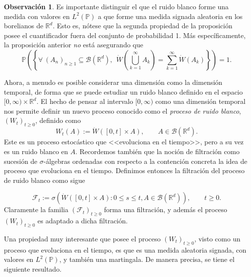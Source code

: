 \documentclass[letterpaper,twoside,12pt]{book}
\newcommand{\R}{\mathbb{R}}
\newcommand{\F}{\mathcal{F}}
\newcommand{\B}{\mathcal{B}}
\renewcommand{\P}{\mathbb{P}}
\newcommand{\W}{\dot{W}}
\newcommand{\1}{\mathds{1}}
\theoremstyle{definition}
\theoremstyle{definition}
\theoremstyle{remark}
\theoremstyle{definition}
\theoremstyle{definition}
\theoremstyle{definition}
\newtheorem{obs}{Observación}
\theoremstyle{definition}
\theoremstyle{definition}
\begin{document}
 \begin{obs}
   Es importante distinguir el que el ruido blanco forme una medida con valores en $L^{2}(\P)$ a que forme una medida signada aleatoria en los borelianos de $\R^d$. Esto es, nótese que la segunda propiedad de la proposición posee el cuantificador fuera del conjunto de probabilidad 1. Más específicamente, la proposición anterior \textit{no} está asegurando que 
   \[
   \P\left(\left\{\forall \ (A_n)_{n\geq1}\subseteq\B(\R^{d}), \ \ \W \left(\bigcup_{k=1}^\infty A_k\right)=\sum_{k=1}^{\infty}\W(A_k)\right\}\right)=1.
   \]
\end{obs}
Ahora, a menudo es posible considerar una dimensión como la dimensión temporal, de forma que se puede estudiar un ruido blanco definido en el espacio $[0,\infty)\times\R^{d}$. El hecho de pensar al intervalo $[0,\infty)$ como una dimensión temporal nos permite definir un nuevo proceso conocido como el \textit{proceso de ruido blanco}, $(W_t)_{t\geq0}$, definido como 
\[
W_t(A):=\W \left([0,t]\times A\right), \qquad A\in \B(\R^{d}).    
\]
Este es un proceso estocástico que <<evoluciona en el tiempo>>, pero a su vez es un ruido blanco en $A$. Recordemos también que la noción de filtración como sucesión de $\sigma$-álgebras ordenadas con respecto a la contención concreta la idea de proceso que evoluciona en el tiempo. Definimos entonces la filtración del proceso de ruido blanco como sigue

\begin{equation}\label{filtracionruidoblanco}
   \F_t:=\sigma \left(\W([0,t]\times A):0\leq s\leq t, A\in \B(\R^{d})\right), \qquad t\geq0.    
\end{equation}
Claramente la familia $(\F_t)_{t\geq0}$ forma una filtración, y además el proceso $(W_t)_{t\geq0}$ es adaptado a dicha filtración.

Una propiedad muy interesante que posee el proceso $(W_t)_{t\geq0}$, visto como un proceso que evoluciona en el tiempo, es que es una medida aleatoria signada, con valores en $L^2(\P)$, y también una martingala. De manera precisa, se tiene el siguiente resultado.
\end{document}
